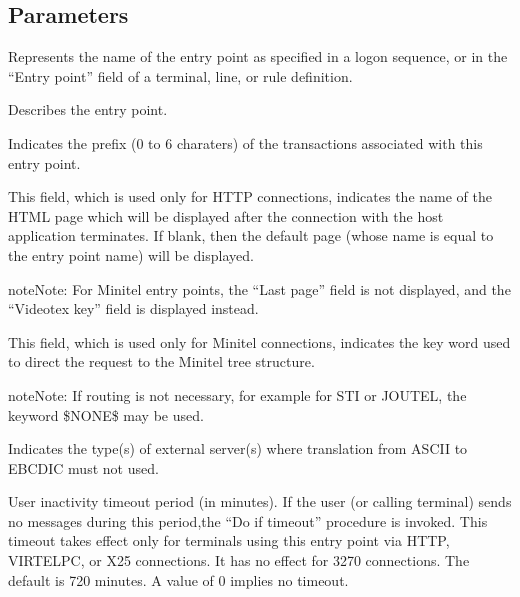 \documentclass[letterpaper,10pt,english]{sphinxmanual}
\begin{document}
\subsection{Parameters}
\label{\detokenize{connectivity_guide:index-112}}\label{\detokenize{connectivity_guide:id61}}\begin{description}
\sphinxAtStartPar
Represents the name of the entry point as specified in a logon sequence, or in the “Entry point” field of a terminal, line, or rule definition.

\sphinxAtStartPar
Describes the entry point.

\sphinxAtStartPar
Indicates the prefix (0 to 6 charaters) of the transactions associated with this entry point.

\sphinxAtStartPar
This field, which is used only for HTTP connections, indicates the name of the HTML page which will be displayed after the connection with the host application terminates. If blank, then the default page (whose name is equal to the entry point name) will be displayed.

\begin{sphinxadmonition}{note}{Note:}
\sphinxAtStartPar
For Minitel entry points, the “Last page” field is not displayed, and the “Videotex key” field is displayed instead.
\end{sphinxadmonition}

\sphinxAtStartPar
This field, which is used only for Minitel connections, indicates the key word used to direct the request to the Minitel tree structure.

\begin{sphinxadmonition}{note}{Note:}
\sphinxAtStartPar
If routing is not necessary, for example for STI or JOUTEL, the keyword \$NONE\$ may be used.
\end{sphinxadmonition}

\sphinxAtStartPar
Indicates the type(s) of external server(s) where translation from ASCII to EBCDIC must not used.

\sphinxAtStartPar
User inactivity timeout period (in minutes). If the user (or calling terminal) sends no messages during this period,the “Do if timeout” procedure is invoked. This timeout takes effect only for terminals using this entry point via HTTP, VIRTELPC, or X25 connections. It has no effect for 3270 connections. The default is 720 minutes. A value of 0 implies no timeout.


\end{description}
\end{document}
